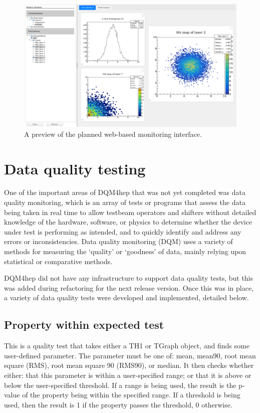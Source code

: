 \begin{figure}
	\centering
	\includegraphics[width=1.0\textwidth]{../Pictures/ScreenshotWebMonitoring.png}
	\caption{A preview of the planned web-based monitoring interface.}
	\label{figure:daq/dqm4hep/future-gui}
\end{figure}

\section{Data quality testing}
One of the important areas of DQM4hep that was not yet completed was data quality monitoring, which is an array of tests or programs that assess the data being taken in real time to allow testbeam operators and shifters without detailed knowledge of the hardware, software, or physics to determine whether the device under test is performing as intended, and to quickly identify and address any errors or inconsistencies. Data quality monitoring (DQM) uses a variety of methods for measuring the `quality' or `goodness' of data, mainly relying upon statistical or comparative methods.

DQM4hep did not have any infrastructure to support data quality tests, but this was added during refactoring for the next release version. Once this was in place, a variety of data quality tests were developed and implemented, detailed below.

\subsection{Property within expected test}
This is a quality test that takes either a TH1 or TGraph object, and finds some user-defined parameter. The parameter must be one of: mean, mean90, root mean square (RMS), root mean square 90 (RMS90), or median. It then checks whether either: that this parameter is within a user-specified range; or that it is above or below the user-specified threshold. If a range is being used, the result is the p-value of the property being within the specified range. If a threshold is being used, then the result is 1 if the property passes the threshold, 0 otherwise.

